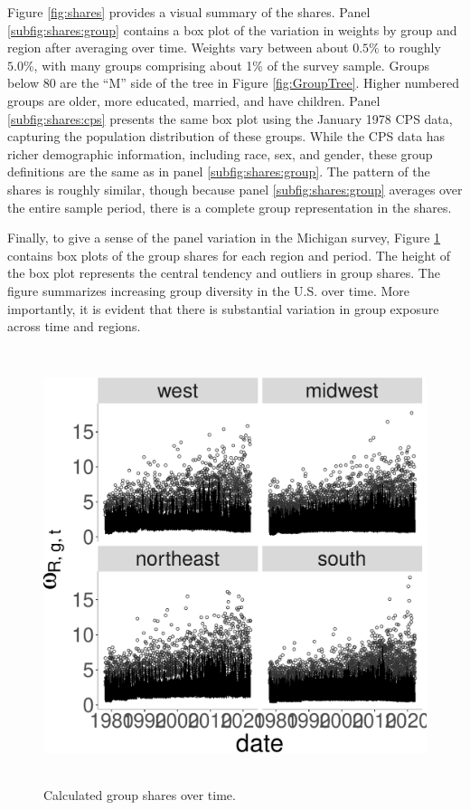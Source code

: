 \documentclass[12pt]{article}
\begin{document}
Figure \ref{fig:shares} provides a visual summary of the shares. Panel \ref{subfig:shares:group} contains a box plot of the variation in weights by group and region after averaging over time. Weights vary between about $0.5\%$ to roughly $5.0\%$, with many groups comprising about 1\% of the survey sample. Groups below 80 are the ``M'' side of the tree in Figure \ref{fig:GroupTree}. Higher numbered groups are older, more educated, married, and have children. Panel \ref{subfig:shares:cps} presents the same box plot using the January 1978 CPS data, capturing the population distribution of these groups. While the CPS data has richer demographic information, including race, sex, and gender, these group definitions are the same as in panel \ref{subfig:shares:group}. The pattern of the shares is roughly similar, though because panel \ref{subfig:shares:group} averages over the entire sample period, there is a complete group representation in the shares.  


Finally, to give a sense of the panel variation in the Michigan survey, Figure \ref{fig:sharesTime} contains box plots of the group shares for each region and period. The height of the box plot represents the central tendency and outliers in group shares. The figure summarizes increasing group diversity in the U.S. over time. More importantly, it is evident that there is substantial variation in group exposure across time and regions.
\begin{figure}
\centering
\caption{Calculated group shares over time.}\label{fig:sharesTime}
\centering
\includegraphics[width = 6in, height =5in]{figs/weightsTime.pdf}
\end{figure}
\end{document}
